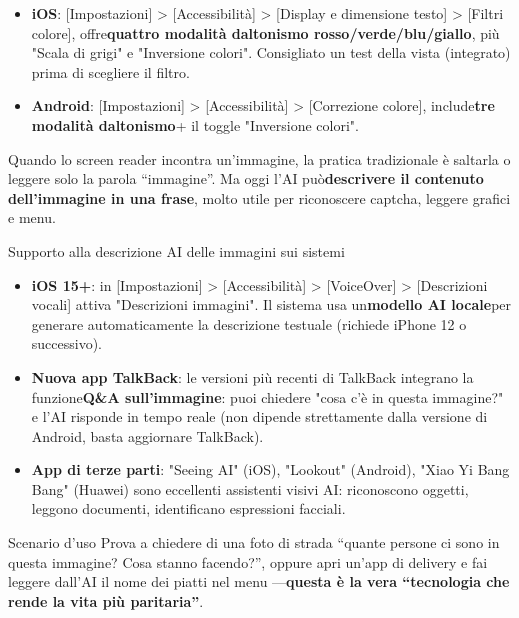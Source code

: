 
\begin{itemize}
  \item \textbf{iOS}: [Impostazioni] > [Accessibilità] > [Display e dimensione testo] > [Filtri colore], offre\textbf{quattro modalità daltonismo rosso/verde/blu/giallo}, più "Scala di grigi" e "Inversione colori". Consigliato un test della vista (integrato) prima di scegliere il filtro.
  \item \textbf{Android}: [Impostazioni] > [Accessibilità] > [Correzione colore], include\textbf{tre modalità daltonismo}+ il toggle "Inversione colori".
\end{itemize}


Quando lo screen reader incontra un'immagine, la pratica tradizionale è saltarla o leggere solo la parola “immagine”. Ma oggi l'AI può\textbf{descrivere il contenuto dell'immagine in una frase}, molto utile per riconoscere captcha, leggere grafici e menu.

\begin{tcbinfo}{Supporto alla descrizione AI delle immagini sui sistemi}
\begin{itemize}
  \item \textbf{iOS 15+}: in [Impostazioni] > [Accessibilità] > [VoiceOver] > [Descrizioni vocali] attiva "Descrizioni immagini". Il sistema usa un\textbf{modello AI locale}per generare automaticamente la descrizione testuale (richiede iPhone 12 o successivo).
  \item \textbf{Nuova app TalkBack}: le versioni più recenti di TalkBack integrano la funzione\textbf{Q\&A sull'immagine}: puoi chiedere "cosa c'è in questa immagine?" e l'AI risponde in tempo reale (non dipende strettamente dalla versione di Android, basta aggiornare TalkBack).
  \item \textbf{App di terze parti}: "Seeing AI" (iOS), "Lookout" (Android), "Xiao Yi Bang Bang" (Huawei) sono eccellenti assistenti visivi AI: riconoscono oggetti, leggono documenti, identificano espressioni facciali.
\end{itemize}

\end{tcbinfo}

\begin{tcbpractice}{Scenario d'uso}
Prova a chiedere di una foto di strada “quante persone ci sono in questa immagine? Cosa stanno facendo?”, oppure apri un'app di delivery e fai leggere dall'AI il nome dei piatti nel menu —\textbf{questa è la vera “tecnologia che rende la vita più paritaria”}.

\end{tcbpractice}

